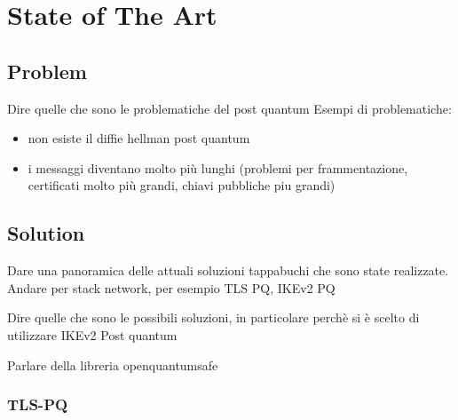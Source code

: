 
\chapter{State of The Art} 

\label{Chapter1}  


\newcommand{\keyword}[1]{\textbf{#1}}
\newcommand{\tabhead}[1]{\textbf{#1}}
\newcommand{\code}[1]{\texttt{#1}}
\newcommand{\file}[1]{\texttt{\bfseries#1}}
\newcommand{\option}[1]{\texttt{\itshape#1}}


\section{Problem}

Dire quelle che sono le problematiche del post quantum
Esempi di problematiche:
\begin{itemize}
\item non esiste il diffie hellman post quantum
\item i messaggi diventano molto più lunghi (problemi per frammentazione,
	certificati molto più grandi, chiavi pubbliche piu grandi)
\end{itemize}


\section{Solution}

Dare una panoramica delle attuali soluzioni tappabuchi che sono state
realizzate. Andare per stack network, per esempio TLS PQ, IKEv2 PQ

Dire quelle che sono le possibili soluzioni, in particolare perchè si è scelto
di utilizzare IKEv2 Post quantum

Parlare della libreria openquantumsafe

\subsection{TLS-PQ}

